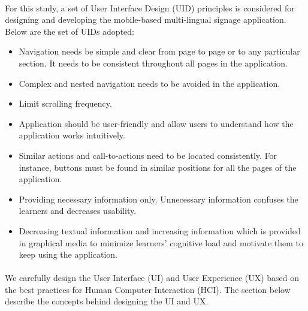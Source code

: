 \documentclass[12pt]{article}
\begin{document}
\paragraph{} For this study, a set of User Interface Design (UID) principles is considered \cite{uid} for designing and developing the mobile-based multi-lingual signage application. Below are the set of UIDs adopted:

\begin{itemize}

 \item  Navigation needs be simple and clear from page to page or to
any particular section. It needs to be
consistent throughout all pages in the application.

 \item  Complex and nested navigation needs to be avoided in the application.

 \item Limit scrolling frequency.

 \item Application should be user-friendly and allow
users to understand how the application works intuitively.

 \item Similar actions and call-to-actions need to be located consistently. For instance,  buttons must be
found in similar positions for all the pages of the
application.

 \item Providing necessary information only. Unnecessary
information confuses the learners and decreases usability.

 \item  Decreasing textual information and increasing
information which is provided in graphical media to minimize learners' cognitive load and motivate
them to keep using the application.

\end{itemize}




\paragraph{}We carefully design the User Interface (UI) and User Experience (UX) based on the best practices for Human Computer Interaction (HCI). The section below describe the concepts behind designing the UI and UX.
\end{document}
